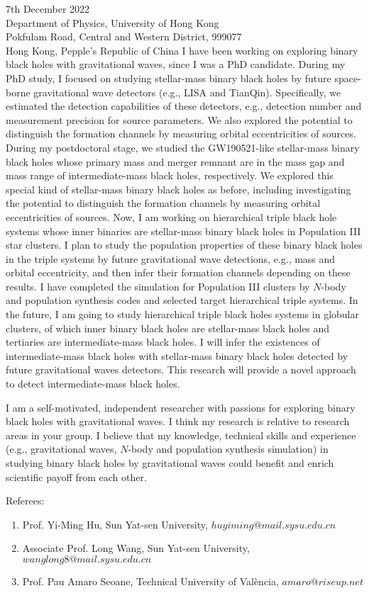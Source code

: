 \documentclass[11pt,a4paper,sans]{letter} %
\begin{document}
\begin{letter}{7th December 2022 \\
Department of Physics, University of Hong Kong\\
Pokfulam Road, Central and Western District, 999077\\ 
Hong Kong, Pepple's Republic of China}
I have been working on exploring binary black holes with gravitational waves, since I was a PhD
    candidate. During my PhD study, I focused on studying stellar-mass binary black holes by future
    space-borne gravitational wave detectors (e.g., LISA and TianQin). Specifically, we estimated the detection
    capabilities of
    these detectors, e.g., detection number and measurement precision for source parameters. We also explored the
    potential to distinguish the formation channels by measuring orbital eccentricities of sources. During my postdoctoral
    stage, we studied the GW190521-like stellar-mass binary black holes whose primary mass and merger remnant are in the
    mass gap and mass range of 
    intermediate-mass black holes, respectively. We explored this special kind of stellar-mass binary black holes as
    before, including investigating the potential to distinguish the formation
    channels by measuring orbital eccentricities of sources. 
    Now, I am working on
    hierarchical triple
    black hole systems whose inner binaries are stellar-mass binary black holes in Population III star clusters. I plan to
    study the population properties of these binary black holes in the triple systems by future gravitational wave detections, e.g., mass and orbital eccentricity, and then
    infer their formation channels depending on these results. I have completed the simulation for Population III
    clusters by $N$-body and population synthesis codes and selected target hierarchical triple systems.  
    In the future, I am going to study hierarchical triple black holes systems in globular clusters, of which inner binary black holes are
    stellar-mass black holes and tertiaries are intermediate-mass black holes. I will infer the existences of
    intermediate-mass black holes with stellar-mass binary black holes detected by future gravitational waves detectors.
    This research will provide a novel approach to detect intermediate-mass black holes.

I am a self-motivated, independent researcher with
    passions for exploring binary black holes with gravitational waves. I think my research is relative to research
    areas in your group. I believe that my knowledge,
    technical skills and experience (e.g., gravitational waves, $N$-body and population synthesis simulation) in studying binary black holes by
    gravitational waves could benefit and enrich scientific payoff
from each other. 

Referees:\begin{enumerate}[itemsep=-0pt,leftmargin=1.2em,topsep=-10pt]
\item Prof. Yi-Ming Hu, Sun Yat-sen University, $huyiming@mail.sysu.edu.cn$
\item Associate Prof. Long Wang, Sun Yat-sen University, $wanglong8@mail.sysu.edu.cn$
\item Prof. Pau Amaro Seoane, Technical University of València, $amaro@riseup.net$\\
\end{enumerate}



\end{letter}
\end{document}
